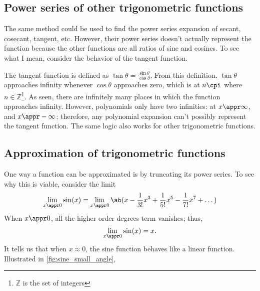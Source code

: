 \subsection{Power series of other trigonometric functions}

The same method could be used to find the power series expansion of secant, cosecant, tangent, etc. However, their power series doesn't actually represent the function because the other functions are all ratios of sine and cosines. To see what I mean, consider the behavior of the tangent function.

The tangent function is defined as $\tan\theta = \frac{\sin\theta}{\cos\theta}$. From this definition, $\tan\theta$ approaches infinity whenever $\cos\theta$ approaches zero, which is at $n\cpi$ where $n \in \mathbb{Z}$\footnote{$\mathbb{Z}$ is the set of integers}. As seen, there are infinitely many places in which the function approaches infinity. However, polynomials only have two infinities: at $x \appr \infty$, and $x \appr -\infty$; therefore, any polynomial expansion can't possibly represent the tangent function. The same logic also works for other trigonometric functions.

\subsection{Approximation of trigonometric functions}

One way a function can be approximated is by truncating its power series. To see why this is viable, consider the limit
\begin{align}
	\lim_{x \appr 0}\sin(x) = \lim_{x \appr 0}\ab(x - \frac{1}{3!}x^3 + \frac{1}{5!}x^5 - \frac{1}{7!}x^7 + \dots)
\end{align}
When $x \appr 0$, all the higher order degrees term vanishes; thus,
\begin{gather}
	\lim_{x \appr 0}\sin(x) = x.
\end{gather}
It tells us that when $x \approx 0$, the sine function behaves like a linear function. Illustrated in \cref{fig:sine_small_angle},

